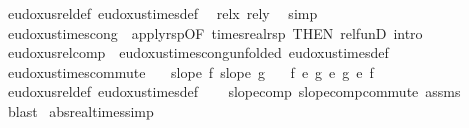 \begin{isabellebody}
\ eudoxus{\isacharunderscore}{\kern0pt}rel{\isacharunderscore}{\kern0pt}def\ eudoxus{\isacharunderscore}{\kern0pt}times{\isacharunderscore}{\kern0pt}def\ \isamarkupfalse%
\ rel{\isacharunderscore}{\kern0pt}x\ rel{\isacharunderscore}{\kern0pt}y\ \isamarkupfalse%
\ simp\isanewline
{}\isamarkupfalse%
%
\endisatagproof
{\isafoldproof}%
%
\isadelimproof
\isanewline
%
\endisadelimproof
\isanewline
{}\isamarkupfalse%
\ eudoxus{\isacharunderscore}{\kern0pt}times{\isacharunderscore}{\kern0pt}cong\ {\isacharequal}{\kern0pt}\ apply{\isacharunderscore}{\kern0pt}rsp{\isacharprime}{\kern0pt}{\isacharbrackleft}{\kern0pt}OF\ times{\isacharunderscore}{\kern0pt}real{\isachardot}{\kern0pt}rsp{\isacharcomma}{\kern0pt}\ THEN\ rel{\isacharunderscore}{\kern0pt}funD{\isacharcomma}{\kern0pt}\ intro{\isacharbrackright}{\kern0pt}\isanewline
{}\isamarkupfalse%
\ eudoxus{\isacharunderscore}{\kern0pt}rel{\isacharunderscore}{\kern0pt}comp\ {\isacharequal}{\kern0pt}\ eudoxus{\isacharunderscore}{\kern0pt}times{\isacharunderscore}{\kern0pt}cong{\isacharbrackleft}{\kern0pt}unfolded\ eudoxus{\isacharunderscore}{\kern0pt}times{\isacharunderscore}{\kern0pt}def{\isacharbrackright}{\kern0pt}\isanewline
\isanewline
{}\isamarkupfalse%
\ eudoxus{\isacharunderscore}{\kern0pt}times{\isacharunderscore}{\kern0pt}commute{\isacharcolon}{\kern0pt}\isanewline
\ \ \ {\isachardoublequoteopen}slope\ f{\isachardoublequoteclose}\ {\isachardoublequoteopen}slope\ g{\isachardoublequoteclose}\isanewline
\ \ \ {\isachardoublequoteopen}{\isacharparenleft}{\kern0pt}f\ {\isacharasterisk}{\kern0pt}\isactrlsub e\ g{\isacharparenright}{\kern0pt}\ {\isasymsim}\isactrlsub e\ {\isacharparenleft}{\kern0pt}g\ {\isacharasterisk}{\kern0pt}\isactrlsub e\ f{\isacharparenright}{\kern0pt}{\isachardoublequoteclose}\isanewline
%
\isadelimproof
\ \ %
\endisadelimproof
%
\isatagproof
{}\isamarkupfalse%
\ eudoxus{\isacharunderscore}{\kern0pt}rel{\isacharunderscore}{\kern0pt}def\ eudoxus{\isacharunderscore}{\kern0pt}times{\isacharunderscore}{\kern0pt}def\isanewline
\ \ \isamarkupfalse%
\ slope{\isacharunderscore}{\kern0pt}comp\ slope{\isacharunderscore}{\kern0pt}comp{\isacharunderscore}{\kern0pt}commute\ assms\ \isamarkupfalse%
\ blast%
\endisatagproof
{\isafoldproof}%
%
\isadelimproof
\isanewline
%
\endisadelimproof
\isanewline
{}\isamarkupfalse%
\ abs{\isacharunderscore}{\kern0pt}real{\isacharunderscore}{\kern0pt}times{\isacharbrackleft}{\kern0pt}simp{\isacharbrackright}{\kern0pt}{\isacharcolon}{\kern0pt}\ \isanewline

\end{isabellebody}
